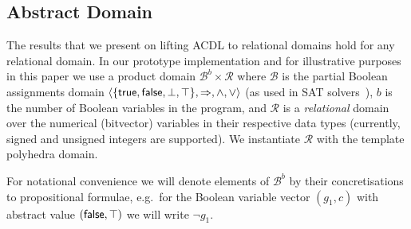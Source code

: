 
\subsection{Abstract Domain}
The results that we present on lifting ACDL to relational domains hold
for any relational domain.
% 
In our prototype implementation and for illustrative purposes in this
paper we use a product domain $\mathcal{B}^b\times\mathcal{R}$ where
$\mathcal{B}$ is the partial Boolean assignments domain
$\langle\{\mathsf{true},\mathsf{false},\bot,\top\},\Rightarrow,\wedge,\vee\rangle$ (as
used in SAT solvers~\cite{sas12}), $b$ is the number of Boolean
variables in the program, and $\mathcal{R}$ is a \emph{relational}
domain over the numerical (bitvector) variables in their respective
data types (currently, signed and unsigned integers are supported).
%
We instantiate $\mathcal{R}$ with the template polyhedra domain.

For notational convenience we will denote elements of
$\mathcal{B}^b$ by their concretisations to propositional formulae,
e.g.\ for the Boolean variable vector $(g_1,c)$ with abstract value
$(\mathsf{false},\top)$ we will write $\neg g_1$.

